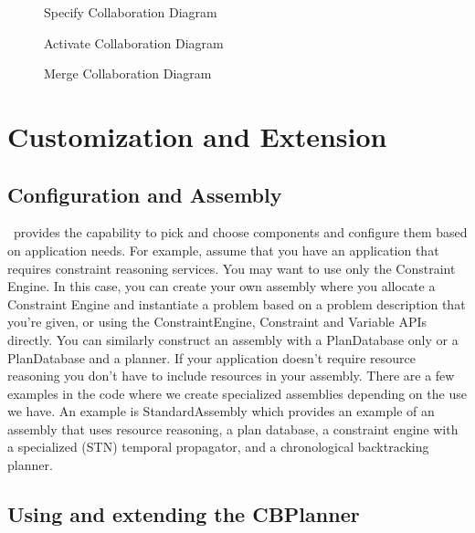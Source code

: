 \documentclass[10pt, letterpaper, twoside]{article}
\begin{document}
\begin{figure}[htb]
\centering{}
\caption{Specify Collaboration Diagram}
\label{SpecifyDiagram}
\end{figure}

\begin{figure}[hbt]
\centering{}
\caption{Activate Collaboration Diagram}
\label{ActivateDiagram}
\end{figure}

\begin{figure}[hbt]
\centering{}
\caption{Merge Collaboration Diagram}
\label{MergeDiagram}
\end{figure}

\section{Customization and Extension}
\subsection{Configuration and Assembly}
\label{assembly}

\ET\, provides the capability to pick and choose components and configure
them based on application needs.  For example, assume that you have an
application that requires constraint reasoning services.  You may want to
use only the Constraint Engine.  In this case, you can create your own
assembly where you allocate a Constraint Engine and instantiate a problem
based on a problem description that you're given, or using the
ConstraintEngine, Constraint and Variable APIs directly. You can similarly
construct an assembly with a PlanDatabase only or a PlanDatabase and a
planner. If your application doesn't require resource reasoning you don't
have to include resources in your assembly. There are a few examples in the
code where we create specialized assemblies depending on the use we have.
An example is StandardAssembly which provides an example of an assembly
that uses resource reasoning, a plan database, a constraint engine with a
specialized (STN) temporal propagator, and a chronological backtracking
planner.


\subsection{Using and extending the CBPlanner}
\end{document}

